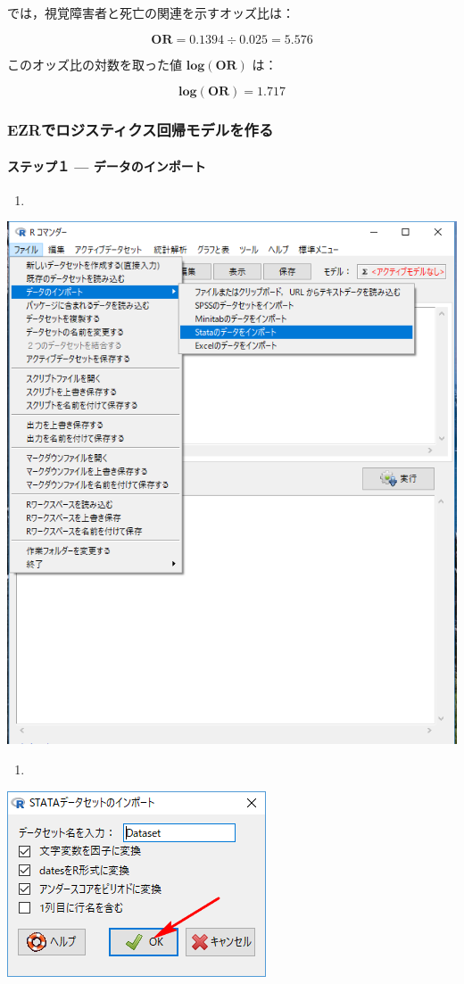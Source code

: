 \documentclass[11pt,]{problemset}
\let\oldparagraph\paragraph
\renewcommand{\paragraph}[1]{\oldparagraph{#1}\mbox{}}
\begin{document}
では，視覚障害者と死亡の関連を示すオッズ比は：

\[
\mathbf{OR} = 0.1394 \div 0.025 = 5.576
\]

このオッズ比の対数を取った値 \(\mathbf{log(OR)}\) は：

\[
\mathbf{log(OR)} = 1.717
\]

\hypertarget{ezr}{%
\subsubsection{EZRでロジスティクス回帰モデルを作る}\label{ezr}}

\hypertarget{-}{%
\paragraph{ステップ１ --- データのインポート}\label{-}}

\begin{enumerate}
\def\labelenumi{\arabic{enumi}.}
\item
\end{enumerate}

\begin{center}\includegraphics[width=0.5\linewidth]{pic/import00} \end{center}

\newpage
\vfill

\begin{enumerate}
\def\labelenumi{\arabic{enumi}.}
\setcounter{enumi}{1}
\item
\end{enumerate}

\begin{center}\includegraphics[width=0.3\linewidth]{pic/logstic01} \end{center}
\end{document}
